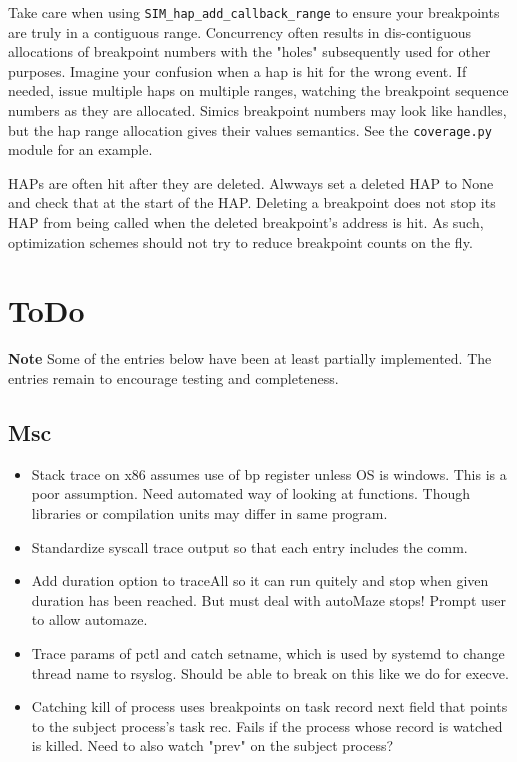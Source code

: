 \documentclass[titlepage]{article}
\begin{document}
\begin{appendices}
Take care when using {\tt SIM\_hap\_add\_callback\_range} to ensure your breakpoints are truly in a contiguous range.
Concurrency often results in dis-contiguous allocations of breakpoint numbers with the "holes" subsequently used for other purposes.
Imagine your confusion when a hap is hit for the wrong event.  If needed, issue multiple haps on multiple ranges, watching the
breakpoint sequence numbers as they are allocated.  Simics breakpoint numbers may look like handles, but the hap range allocation 
gives their values semantics.  See the {\tt coverage.py} module for an example.

HAPs are often hit after they are deleted.  Alwways set a deleted HAP to None and check that at the start of the HAP.
Deleting a breakpoint does not stop its HAP from being called when the deleted breakpoint's address is hit.  As such,
optimization schemes should not try to reduce breakpoint counts on the fly.

\section{ToDo}
\textbf{Note} Some of the entries below have been at least partially implemented.  The entries remain to encourage testing and completeness.
\subsection {Msc}
\begin{itemize}
\item Stack trace on x86 assumes use of bp register unless OS is windows.  This is a poor assumption.  Need automated way
of looking at functions.  Though libraries or compilation units may differ in same program.

\item Standardize syscall trace output so that each entry includes the comm.

\item Add duration option to traceAll so it can run quitely and stop when given duration has been reached.  But must deal with
autoMaze stops!  Prompt user to allow automaze.

\item Trace params of pctl and catch setname, which is used by systemd to change thread name to rsyslog.  Should be able to 
break on this like we do for execve.

\item Catching kill of process uses breakpoints on task record next field that points to the subject process's task rec.  Fails if the
process whose record is watched is killed.  Need to also watch "prev" on the subject process?


\end{itemize}
\end{appendices}
\end{document}
